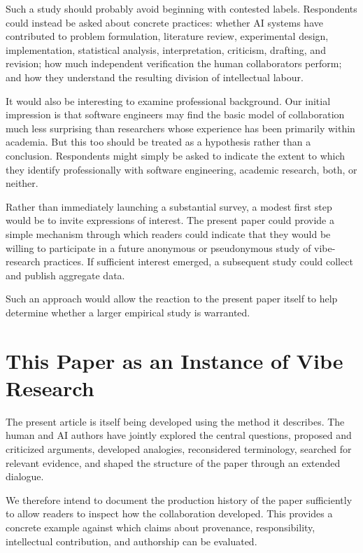Such a study should probably avoid beginning with contested labels. Respondents could instead be asked about concrete practices: whether AI systems have contributed to problem formulation, literature review, experimental design, implementation, statistical analysis, interpretation, criticism, drafting, and revision; how much independent verification the human collaborators perform; and how they understand the resulting division of intellectual labour.

It would also be interesting to examine professional background. Our initial impression is that software engineers may find the basic model of collaboration much less surprising than researchers whose experience has been primarily within academia. But this too should be treated as a hypothesis rather than a conclusion. Respondents might simply be asked to indicate the extent to which they identify professionally with software engineering, academic research, both, or neither.

Rather than immediately launching a substantial survey, a modest first step would be to invite expressions of interest. The present paper could provide a simple mechanism through which readers could indicate that they would be willing to participate in a future anonymous or pseudonymous study of vibe-research practices. If sufficient interest emerged, a subsequent study could collect and publish aggregate data.

Such an approach would allow the reaction to the present paper itself to help determine whether a larger empirical study is warranted.


\section{This Paper as an Instance of Vibe Research}

The present article is itself being developed using the method it describes. The human and AI authors have jointly explored the central questions, proposed and criticized arguments, developed analogies, reconsidered terminology, searched for relevant evidence, and shaped the structure of the paper through an extended dialogue.

We therefore intend to document the production history of the paper sufficiently to allow readers to inspect how the collaboration developed. This provides a concrete example against which claims about provenance, responsibility, intellectual contribution, and authorship can be evaluated.

